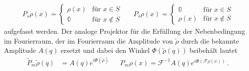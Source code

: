 \begin{align}
 P_s\rho (x)=\begin{cases}
 \rho (x)  &\text{für } x\in S\\
 \mathbb{0}  &\text{für }x\notin S
 \end{cases}&&
 P_{\bar{s}}\rho (x)=\begin{cases}
 \mathbb{0} &\text{für } x\in S\\
 \rho (x)   &\text{für }x\notin S
 \end{cases}
 \end{align}
aufgefasst werden. Der analoge Projektor für die Erfüllung der Nebenbedingung im Fourierraum, der im Fourierraum die Amplitude von $\tilde{\rho}$ durch die bekannte Amplitude $A(q)$ ersetzt und dabei den Winkel $\Phi\left(\tilde{\rho}\left(q\right)\right)$ beibehält lautet
\begin{align}
	\tilde{P}_m \tilde{\rho}(q)&=A(q)e^{i\Phi(\tilde{\rho})}&&P_m\rho(x)=\mathscr{F}^{-1}A(q)e^{i\Phi\left(\mathscr{F}\rho\left(x\right)\right)} \,.
\end{align}

